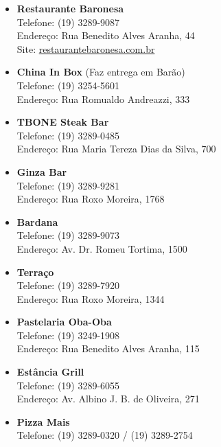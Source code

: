 \begin{itemize}
    \item   \textbf{Restaurante Baronesa}
        \\Telefone: (19) 3289-9087
        \\Endereço: Rua Benedito Alves Aranha, 44
        \\Site: \url{restaurantebaronesa.com.br}

    \item   \textbf{China In Box} (Faz entrega em Barão)
        \\Telefone: (19) 3254-5601
        \\Endereço: Rua Romualdo Andreazzi, 333

    \item   \textbf{TBONE Steak Bar}
        \\Telefone: (19) 3289-0485
        \\Endereço: Rua Maria Tereza Dias da Silva, 700

    \item   \textbf{Ginza Bar}
        \\Telefone: (19) 3289-9281
        \\Endereço: Rua Roxo Moreira, 1768

    \item   \textbf{Bardana}
        \\Telefone: (19) 3289-9073
        \\Endereço: Av. Dr. Romeu Tortima, 1500

    \item   \textbf{Terraço}
        \\Telefone: (19) 3289-7920
        \\Endereço: Rua Roxo Moreira, 1344

    \item   \textbf{Pastelaria Oba-Oba}
        \\Telefone: (19) 3249-1908
        \\Endereço: Rua Benedito Alves Aranha, 115

    \item   \textbf{Estância Grill}
        \\Telefone: (19) 3289-6055
        \\Endereço: Av. Albino J. B. de Oliveira, 271
        
    \item   \textbf{Pizza Mais}
        \\Telefone: (19) 3289-0320 / (19) 3289-2754


\end{itemize}

